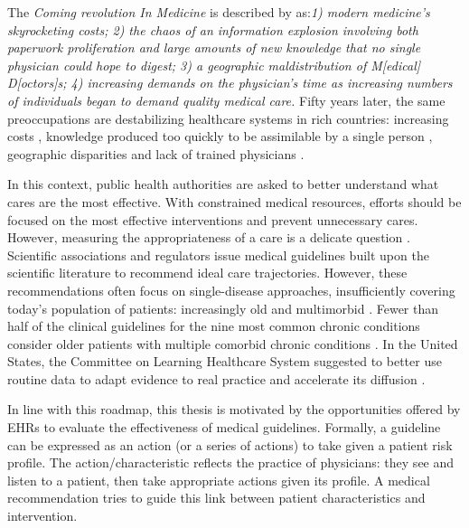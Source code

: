 \documentclass[french,12pt,twoside,a4paper]{book}
\begin{document}
The \emph{Coming revolution In Medicine} is described by
\cite{rutstein1967coming} as:\textit{1) modern medicine's skyrocketing costs; 2)
  the chaos of an information explosion involving both paperwork proliferation and
  large amounts of new knowledge that no single physician could hope to digest; 3)
  a geographic maldistribution of M[edical] D[octors]s; 4) increasing demands on
  the physician's time as increasing numbers of individuals began to demand
  quality medical care.} Fifty years later, the same preoccupations are
destabilizing healthcare systems in rich countries: increasing costs
\citep{data_oecd_health_spending}, knowledge produced too quickly to be
assimilable by a single person \citep{mcginnis2013best}, geographic disparities
and lack of trained physicians \citep{anguis2021quelle,aamc2021}.

In this context, public health authorities are asked to better understand what
cares are the most effective. With constrained medical resources, efforts should
be focused on the most effective interventions and prevent unnecessary cares.
However, measuring the appropriateness of a care is a delicate question
\citep{cma_policy_appropriateness_2015}. Scientific associations and regulators
issue medical guidelines built upon the scientific literature to recommend ideal
care trajectories. However, these recommendations often focus on single-disease
approaches, insufficiently covering today's population of patients: increasingly
old and multimorbid \citep{skou2022multimorbidity}. Fewer than half of the
clinical guidelines for the nine most common chronic conditions consider older
patients with multiple comorbid chronic conditions
\citep{boyd2005clinical,parekh2010challenge}. In the United States, the
Committee on Learning Healthcare System suggested to better use routine data to
adapt evidence to real practice and accelerate its diffusion
\citep{mcginnis2013best}.

In line with this roadmap, this thesis is motivated by the opportunities offered by
EHRs to evaluate the effectiveness of medical guidelines. Formally, a
guideline can be expressed as an action (or a series of actions) to take given a
patient risk profile. The action/characteristic reflects the
practice of  physicians: they see and listen to a patient, then take
appropriate actions given its profile. A medical recommendation tries to
guide this link between patient characteristics and intervention.
\end{document}
